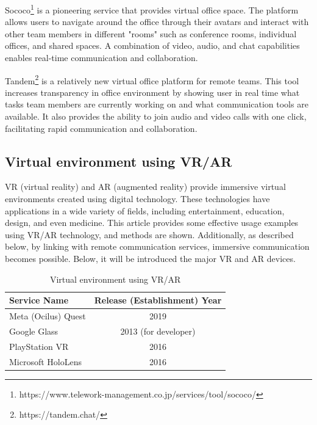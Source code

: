 \documentclass[12pt]{article}
\begin{document}
Sococo\footnote{https://www.telework-management.co.jp/services/tool/sococo/} is
a pioneering service that provides virtual office space. The platform
allows users to navigate around the office through their avatars and interact
with other team members in different "rooms" such as conference rooms,
individual offices, and shared spaces. A combination of video, audio, and chat
capabilities enables real-time communication and collaboration.

Tandem\footnote{https://tandem.chat/} is a relatively new virtual office
platform for remote teams. This tool
increases transparency in office environment by showing user in real time
what tasks team members are currently working on and what communication
tools are available. It also provides the ability to join audio and video calls
with one click, facilitating rapid communication and collaboration.

\subsection{Virtual environment using VR/AR}
VR (virtual reality) and AR (augmented reality) provide immersive virtual
environments created using digital technology. These technologies have
applications in a wide variety of fields, including entertainment, education,
design, and even medicine. This article\cite{vr_usecase} provides some
effective
usage examples using VR/AR technology, and methods are
shown. Additionally, as described below, by linking with remote communication
services, immersive communication becomes possible. Below, it will be
introduced
the major VR and AR devices.

\begin{table}[h]
    \begin{center}
        \begin{tabular}{|l|c|} \hline
            Service Name        & Release (Establishment) Year \\ \hline
            Meta (Ocilus) Quest & 2019                         \\
            Google Glass        & 2013 (for developer)         \\
            PlayStation VR      & 2016                         \\
            Microsoft HoloLens  & 2016                         \\ \hline
        \end{tabular}
        \caption{Virtual environment using VR/AR}
    \end{center}
\end{table}
\end{document}
